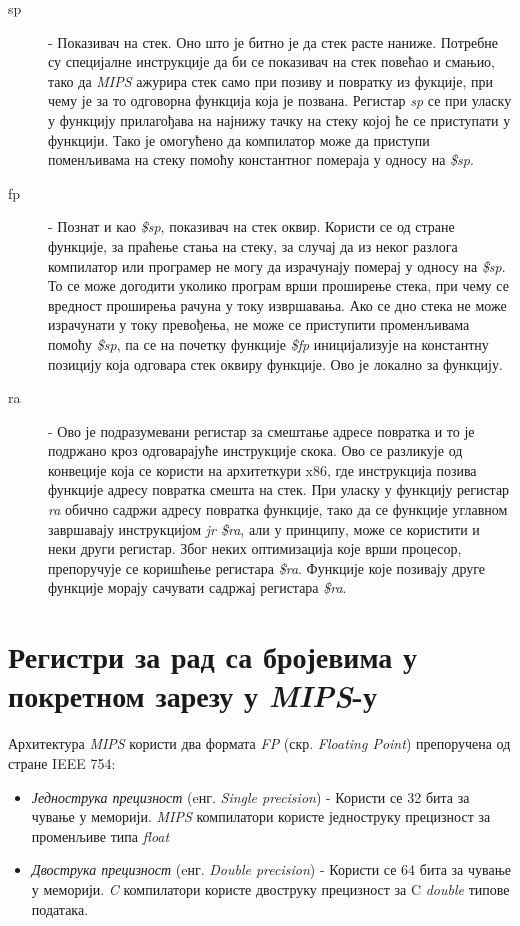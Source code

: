 \documentclass[12pt,oneside]{memoir}
\begin{document}
\begin{description}
  \item[sp] - Показивач на стек. Оно што је битно је да стек расте наниже. Потребне су специјалне инструкције да би се показивач на стек повећао и смањио, тако да \textit{MIPS} ажурира стек само при позиву и повратку из фукције, при чему је за то одговорна функција која је позвана. Регистар \textit{sp} се при уласку у функцију прилагођава на најнижу тачку на стеку којој ће се приступати у функцији. Тако је омогућено да компилатор може да приступи поменљивама на стеку помоћу константног помераја у односу на \textit{\$sp}.
  \item[fp] - Познат и као \textit{\$sp}, показивач на стек оквир. Користи се од стране функције, за праћење стања на стеку, за случај да из неког разлога компилатор или програмер не могу да израчунају померај у односу на \textit{\$sp}. То се може догодити уколико програм врши проширење стека, при чему се вредност проширења рачуна у току извршавања. Ако се дно стека не може израчунати у току превођења, не може се приступити променљивама помоћу \textit{\$sp}, па се на почетку функције \textit{\$fp} иницијализује на константну позицију која одговара стек оквиру функције. Ово је локално за функцију.
  \item[ra] - Ово је подразумевани регистар за смештање адресе повратка и то је подржано кроз одговарајуће инструкције скока. Ово се разликује од конвеције која се користи на архитеткури x86, где инструкција позива функције адресу повратка смешта на стек. При уласку у функцију регистар \textit{ra} обично садржи адресу повратка функције, тако да се функције углавном завршавају инструкцијом \textit{jr \$ra}, али у принципу, може се користити и неки други регистар. Због неких оптимизација које врши процесор, препоручује се коришћење регистара \textit{\$ra}. Функције које позивају друге функције морају сачувати садржај регистара \textit{\$ra}.
\end{description}


\section{Регистри за рад са бројевима у покретном зарезу у \textit{MIPS}-у}
\label{fp_registri}

Архитектура \textit{MIPS} користи два формата \textit{FP} (скр. \textit{Floating Point}) препоручена од стране IEEE 754:

\begin{itemize}
	\item \textit{Једнострука прецизност} (eнг. \textit{Single precision}) - Користи се 32 бита за чување у меморији. \textit{MIPS} компилатори користе једноструку прецизност за променљиве типа \textit{float}
	\item \textit{Двострука прецизност} (eнг. \textit{Double precision}) - Користи се 64 бита за чување у меморији. \textit{C} компилатори користе двоструку прецизност за C \textit{double} типове података.
\end{itemize}
\end{document}
